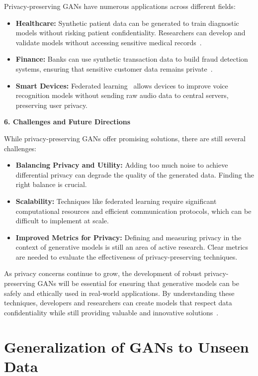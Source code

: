 Privacy-preserving GANs have numerous applications across different fields:
\begin{itemize}
    \item \textbf{Healthcare:} Synthetic patient data can be generated to train diagnostic models without risking patient confidentiality. Researchers can develop and validate models without accessing sensitive medical records~\cite{pan2019recent}.
    \item \textbf{Finance:} Banks can use synthetic transaction data to build fraud detection systems, ensuring that sensitive customer data remains private~\cite{wu2019privacy}.
    \item \textbf{Smart Devices:} Federated learning~\cite{mcmahan2017communication} allows devices to improve voice recognition models without sending raw audio data to central servers, preserving user privacy.
\end{itemize}

\textbf{6. Challenges and Future Directions}

While privacy-preserving GANs offer promising solutions, there are still several challenges:
\begin{itemize}
    \item \textbf{Balancing Privacy and Utility:} Adding too much noise to achieve differential privacy can degrade the quality of the generated data. Finding the right balance is crucial.
    \item \textbf{Scalability:} Techniques like federated learning require significant computational resources and efficient communication protocols, which can be difficult to implement at scale.
    \item \textbf{Improved Metrics for Privacy:} Defining and measuring privacy in the context of generative models is still an area of active research. Clear metrics are needed to evaluate the effectiveness of privacy-preserving techniques.
\end{itemize}

As privacy concerns continue to grow, the development of robust privacy-preserving GANs will be essential for ensuring that generative models can be safely and ethically used in real-world applications. By understanding these techniques, developers and researchers can create models that respect data confidentiality while still providing valuable and innovative solutions~\cite{li2024survey}.



\section{Generalization of GANs to Unseen Data}

